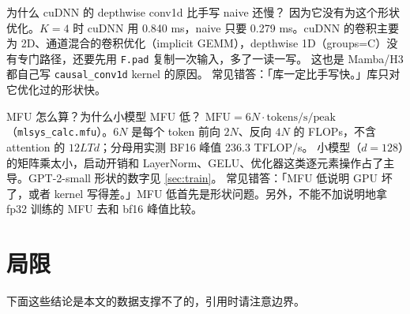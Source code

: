 \documentclass[11pt,a4paper]{ctexart}
\begin{document}
\begin{iqbox}{为什么 cuDNN 的 depthwise conv1d 比手写 naive 还慢？}
因为它没有为这个形状优化。$K=4$ 时 cuDNN 用 0.840 ms，naive 只要 0.279 ms。cuDNN 的卷积主要为 2D、通道混合的卷积优化（implicit GEMM），depthwise 1D（groups=C）没有专门路径，还要先用 \texttt{F.pad} 复制一次输入，多了一读一写。
这也是 Mamba/H3 都自己写 \texttt{causal\_conv1d} kernel 的原因。
\tcblower
常见错答：「库一定比手写快。」库只对它优化过的形状快。
\end{iqbox}

\begin{iqbox}{MFU 怎么算？为什么小模型 MFU 低？}
$\text{MFU}=6N\cdot\text{tokens/s}/\text{peak}$（\texttt{mlsys\_calc.mfu}）。$6N$ 是每个 token 前向 $2N$、反向 $4N$ 的 FLOPs，不含 attention 的 $12LTd$；分母用实测 BF16 峰值 236.3 TFLOP/s。
小模型（$d=128$）的矩阵乘太小，启动开销和 LayerNorm、GELU、优化器这类逐元素操作占了主导。GPT-2-small 形状的数字见 \cref{sec:train}。
\tcblower
常见错答：「MFU 低说明 GPU 坏了，或者 kernel 写得差。」MFU 低首先是形状问题。另外，不能不加说明地拿 fp32 训练的 MFU 去和 bf16 峰值比较。
\end{iqbox}

\section{局限}

下面这些结论是本文的数据支撑不了的，引用时请注意边界。
\end{document}
